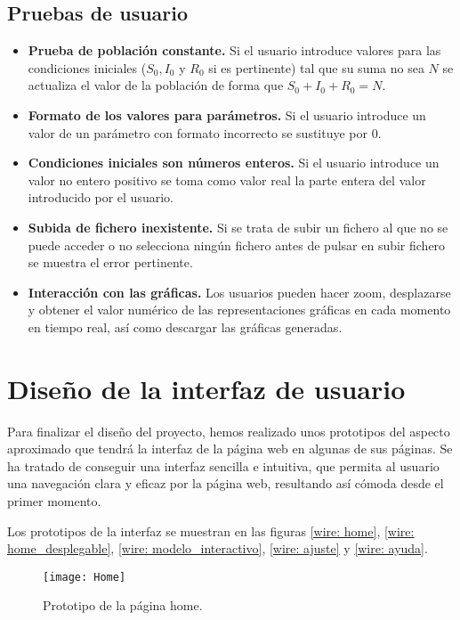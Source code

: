 \subsection{Pruebas de usuario}

\begin{itemize}
\item \textbf{Prueba de población constante.} Si el usuario introduce valores para las condiciones iniciales ($S_0, I_0$ y $R_0$ si es pertinente) tal que su suma no sea $N$ se actualiza el valor de la población de forma que $S_0+I_0+R_0=N$.
\item \textbf{Formato de los valores para parámetros.} Si el usuario introduce un valor de un parámetro con formato incorrecto se sustituye por $0$.
\item \textbf{Condiciones iniciales son números enteros.} Si el usuario introduce un valor no entero positivo se toma como valor real la parte entera del valor introducido por el usuario.
\item \textbf{Subida de fichero inexistente.} Si se trata de subir un fichero al que no se puede acceder o no selecciona ningún fichero antes de pulsar en subir fichero se muestra el error pertinente.
\item \textbf{Interacción con las gráficas.} Los usuarios pueden hacer zoom, desplazarse y obtener el valor numérico de las representaciones gráficas en cada momento en tiempo real, así como descargar las gráficas generadas.
\end{itemize}


\section{Diseño de la interfaz de usuario}

Para finalizar el diseño del proyecto, hemos realizado unos prototipos del aspecto aproximado que tendrá la interfaz de la página web en algunas de sus páginas. Se ha tratado de conseguir una interfaz sencilla e intuitiva, que permita al usuario una navegación clara y eficaz por la página web, resultando así cómoda desde el primer momento.

Los prototipos de la interfaz se muestran en las figuras \eqref{wire: home}, \eqref{wire: home_desplegable}, \eqref{wire: modelo_interactivo}, \eqref{wire: ajuste} y \eqref{wire: ayuda}.

\begin{figure}
\begin{center}
\caption{Prototipo de la página home.}
\label{wire: home}
\texttt{[image: Home]}
\end{center}
\end{figure}

